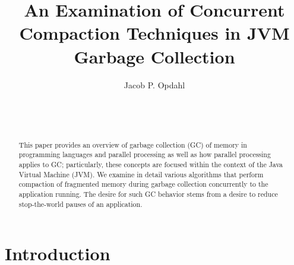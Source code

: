 \documentclass{sig-alternate}
\begin{document}

\title{An Examination of Concurrent Compaction Techniques in JVM Garbage Collection}


\author{
\alignauthor
Jacob P. Opdahl\\
	\\
	\\
	\\
}

\maketitle
\begin{abstract}
This paper provides an overview of garbage collection (GC) of memory 
in programming languages and parallel processing as well as how 
parallel processing applies to GC; particularly, these
concepts are focused within the context of the Java Virtual Machine (JVM).
We examine in detail various algorithms that perform compaction of fragmented 
memory during garbage collection concurrently to the application running.
The desire for such GC behavior stems from a desire to reduce stop-the-world
pauses of an application.
\end{abstract}


\section{Introduction}
\label{sec:introduction}
\end{document}
